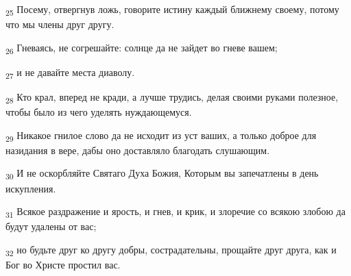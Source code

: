 \begin{tcolorbox}
\textsubscript{25} Посему, отвергнув ложь, говорите истину каждый ближнему своему, потому что мы члены друг другу.
\end{tcolorbox}
\begin{tcolorbox}
\textsubscript{26} Гневаясь, не согрешайте: солнце да не зайдет во гневе вашем;
\end{tcolorbox}
\begin{tcolorbox}
\textsubscript{27} и не давайте места диаволу.
\end{tcolorbox}
\begin{tcolorbox}
\textsubscript{28} Кто крал, вперед не кради, а лучше трудись, делая своими руками полезное, чтобы было из чего уделять нуждающемуся.
\end{tcolorbox}
\begin{tcolorbox}
\textsubscript{29} Никакое гнилое слово да не исходит из уст ваших, а только доброе для назидания в вере, дабы оно доставляло благодать слушающим.
\end{tcolorbox}
\begin{tcolorbox}
\textsubscript{30} И не оскорбляйте Святаго Духа Божия, Которым вы запечатлены в день искупления.
\end{tcolorbox}
\begin{tcolorbox}
\textsubscript{31} Всякое раздражение и ярость, и гнев, и крик, и злоречие со всякою злобою да будут удалены от вас;
\end{tcolorbox}
\begin{tcolorbox}
\textsubscript{32} но будьте друг ко другу добры, сострадательны, прощайте друг друга, как и Бог во Христе простил вас.
\end{tcolorbox}
